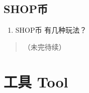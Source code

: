 \documentclass[]{ctexbook}
\providecommand{\tightlist}{%
  \setlength{\itemsep}{0pt}\setlength{\parskip}{0pt}}
\begin{document}
\hypertarget{shop}{%
\section{SHOP币}\label{shop}}

\begin{enumerate}
\def\labelenumi{\arabic{enumi}.}
\tightlist
\item
  SHOP币 有几种玩法？
\end{enumerate}

\begin{quote}
（未完待续）
\end{quote}

\hypertarget{tool}{%
\chapter{工具 Tool}\label{tool}}
\end{document}
